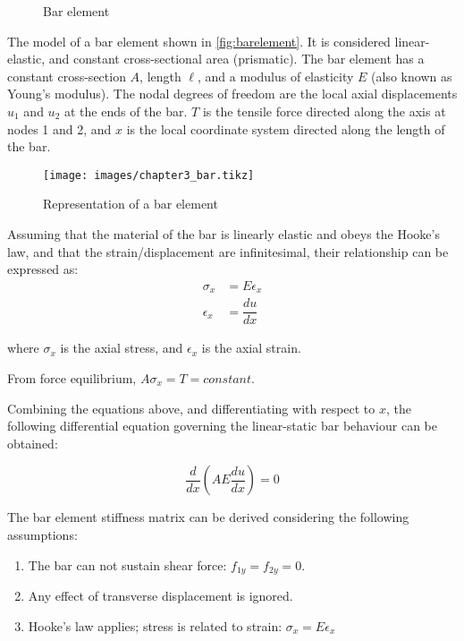 \begin{figure}[H]
    \centering
    \caption{Bar element}
    \label{fig:bar}
    \vspace{0.5em}
\end{figure}

The model of a bar element shown in \autoref{fig:barelement}. It is considered linear-elastic, and constant cross-sectional area (prismatic). The bar element has a constant cross-section $A$, length $\ell$, and a modulus of elasticity $E$ (also known as Young's modulus). The nodal degrees of freedom are the local axial displacements $u_1$ and $u_2$ at the ends of the bar. $T$ is the tensile force directed along the axis at nodes 1 and 2, and $x$ is the local coordinate system directed along the length of the bar.

\begin{figure}[H]
    \caption{Representation of a bar element}
    \label{fig:barelement}
    \centering
    \vspace{1em}
    \texttt{[image: images/chapter3\_bar.tikz]}
\end{figure}

Assuming that the material of the bar is linearly elastic and obeys the Hooke's law, and that the strain/displacement are infinitesimal, their relationship can be expressed as:
%
\begin{align}
    \sigma_x &= E \epsilon_x \\
    \epsilon_x &= \dfrac{du}{dx}
\end{align}

where $\sigma_x$ is the axial stress, and $\epsilon_x$ is the axial strain.

From force equilibrium, $A \sigma_x = T = constant$.

Combining the equations above, and differentiating with respect to $x$, the following differential equation governing the linear-static bar behaviour can be obtained:

\begin{equation}
    \dfrac{d}{dx} \left(AE \dfrac{du}{dx}\right) = 0
\end{equation}

The bar element stiffness matrix can be derived considering the following assumptions:

\begin{enumerate}
    \item The bar can not sustain shear force: $f_{1y} = f_{2y} = 0$.
    \item Any effect of transverse displacement is ignored.
    \item Hooke’s law applies; stress is related to strain: $\sigma_x = E \epsilon_x$
\end{enumerate}

